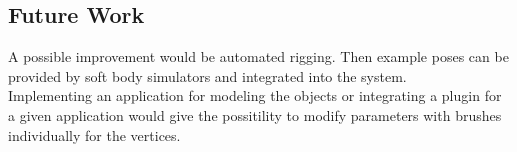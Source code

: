 \documentclass[
	11pt, 
	DIV10,
	a4paper, 
	oneside, 
	headings=normal, 
	captions=tableheading,
	final, 
	numbers=noenddot
]{scrartcl}
\begin{document}
\subsection{Future Work}
A possible improvement would be automated rigging. Then example poses can be provided by soft body simulators and integrated into the system.\\
Implementing an application for modeling the objects or integrating a plugin for a given application would give the possitility to modify parameters with brushes individually for the vertices.





\end{document}
